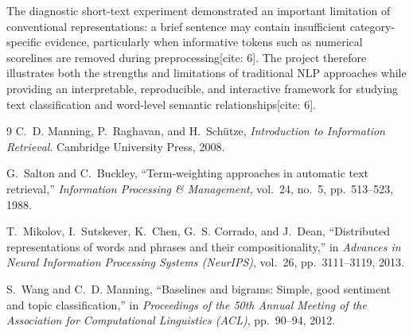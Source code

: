 \documentclass[11pt,a4paper]{article}
\begin{document}
	The diagnostic short-text experiment demonstrated an important limitation of conventional representations: a brief sentence may contain insufficient category-specific evidence, particularly when informative tokens such as numerical scorelines are removed during preprocessing[cite: 6]. The project therefore illustrates both the strengths and limitations of traditional NLP approaches while providing an interpretable, reproducible, and interactive framework for studying text classification and word-level semantic relationships[cite: 6].
	
	\begin{thebibliography}{9}
		C.~D. Manning, P.~Raghavan, and H.~Sch{\"u}tze, 
		\emph{Introduction to Information Retrieval}. 
		Cambridge University Press, 2008.
		
		G.~Salton and C.~Buckley, 
		``Term-weighting approaches in automatic text retrieval,'' 
		\emph{Information Processing \& Management}, vol.~24, no.~5, pp.~513--523, 1988.
		
		T.~Mikolov, I.~Sutskever, K.~Chen, G.~S. Corrado, and J.~Dean, 
		``Distributed representations of words and phrases and their compositionality,'' 
		in \emph{Advances in Neural Information Processing Systems (NeurIPS)}, vol.~26, pp.~3111--3119, 2013.
		
		S.~Wang and C.~D. Manning, 
		``Baselines and bigrams: Simple, good sentiment and topic classification,'' 
		in \emph{Proceedings of the 50th Annual Meeting of the Association for Computational Linguistics (ACL)}, pp.~90--94, 2012.
	\end{thebibliography}
	
\end{document}
